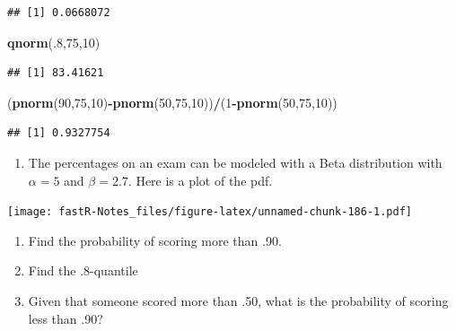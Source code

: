 \documentclass[]{book}
\newenvironment{Shaded}{\begin{snugshade}}{\end{snugshade}}
\newcommand{\KeywordTok}[1]{\textcolor[rgb]{0.13,0.29,0.53}{\textbf{#1}}}
\newcommand{\DecValTok}[1]{\textcolor[rgb]{0.00,0.00,0.81}{#1}}
\newcommand{\OperatorTok}[1]{\textcolor[rgb]{0.81,0.36,0.00}{\textbf{#1}}}
\newcommand{\NormalTok}[1]{#1}
\providecommand{\tightlist}{%
  \setlength{\itemsep}{0pt}\setlength{\parskip}{0pt}}
\theoremstyle{definition}
\theoremstyle{definition}
\theoremstyle{definition}
\theoremstyle{remark}
\begin{document}
\begin{verbatim}
## [1] 0.0668072
\end{verbatim}

\begin{Shaded}
\begin{Highlighting}[]
\KeywordTok{qnorm}\NormalTok{(.}\DecValTok{8}\NormalTok{,}\DecValTok{75}\NormalTok{,}\DecValTok{10}\NormalTok{)}
\end{Highlighting}
\end{Shaded}

\begin{verbatim}
## [1] 83.41621
\end{verbatim}

\begin{Shaded}
\begin{Highlighting}[]
\NormalTok{(}\KeywordTok{pnorm}\NormalTok{(}\DecValTok{90}\NormalTok{,}\DecValTok{75}\NormalTok{,}\DecValTok{10}\NormalTok{)}\OperatorTok{-}\KeywordTok{pnorm}\NormalTok{(}\DecValTok{50}\NormalTok{,}\DecValTok{75}\NormalTok{,}\DecValTok{10}\NormalTok{))}\OperatorTok{/}\NormalTok{(}\DecValTok{1}\OperatorTok{-}\KeywordTok{pnorm}\NormalTok{(}\DecValTok{50}\NormalTok{,}\DecValTok{75}\NormalTok{,}\DecValTok{10}\NormalTok{))}
\end{Highlighting}
\end{Shaded}

\begin{verbatim}
## [1] 0.9327754
\end{verbatim}

\begin{enumerate}
\def\labelenumi{\arabic{enumi})}
\setcounter{enumi}{1}
\tightlist
\item
  The percentages on an exam can be modeled with a Beta distribution
  with \(\alpha = 5\) and \(\beta = 2.7\). Here is a plot of the pdf.
\end{enumerate}

\texttt{[image: fastR-Notes\_files/figure-latex/unnamed-chunk-186-1.pdf]}

\begin{enumerate}
\def\labelenumi{\alph{enumi})}
\tightlist
\item
  Find the probability of scoring more than .90.
\item
  Find the .8-quantile
\item
  Given that someone scored more than .50, what is the probability of
  scoring less than .90?
\end{enumerate}
\end{document}
